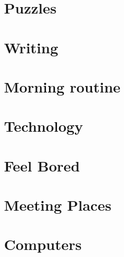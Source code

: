 \documentclass[conference]{IEEEtran}
\begin{document}
\section{Puzzles}

\section{Writing}

\section{Morning routine}

\section{Technology}

\section{Feel Bored}

\section{Meeting Places}

\section{Computers}
\end{document}
